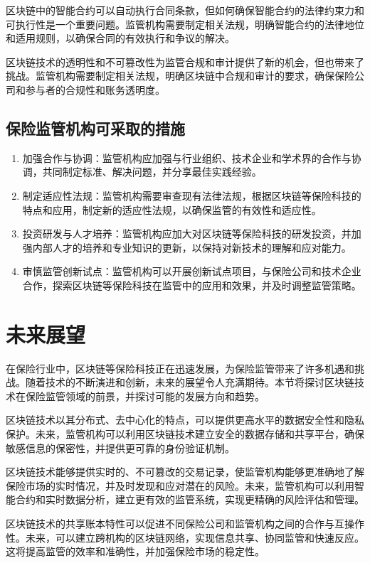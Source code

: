 \documentclass[a4paper,12pt]{ctexart}
\begin{document}
区块链中的智能合约可以自动执行合同条款，但如何确保智能合约的法律约束力和可执行性是一个重要问题。监管机构需要制定相关法规，明确智能合约的法律地位和适用规则，以确保合同的有效执行和争议的解决。

区块链技术的透明性和不可篡改性为监管合规和审计提供了新的机会，但也带来了挑战。监管机构需要制定相关法规，明确区块链中合规和审计的要求，确保保险公司和参与者的合规性和账务透明度。
\subsection{保险监管机构可采取的措施}
\begin{enumerate}
    \item 加强合作与协调：监管机构应加强与行业组织、技术企业和学术界的合作与协调，共同制定标准、解决问题，并分享最佳实践经验。
    \item 制定适应性法规：监管机构需要审查现有法律法规，根据区块链等保险科技的特点和应用，制定新的适应性法规，以确保监管的有效性和适应性。
    \item 投资研发与人才培养：监管机构应加大对区块链等保险科技的研发投资，并加强内部人才的培养和专业知识的更新，以保持对新技术的理解和应对能力。
    \item 审慎监管创新试点：监管机构可以开展创新试点项目，与保险公司和技术企业合作，探索区块链等保险科技在监管中的应用和效果，并及时调整监管策略。
\end{enumerate}
\section{未来展望}
在保险行业中，区块链等保险科技正在迅速发展，为保险监管带来了许多机遇和挑战。随着技术的不断演进和创新，未来的展望令人充满期待。本节将探讨区块链技术在保险监管领域的前景，并探讨可能的发展方向和趋势。

区块链技术以其分布式、去中心化的特点，可以提供更高水平的数据安全性和隐私保护。未来，监管机构可以利用区块链技术建立安全的数据存储和共享平台，确保敏感信息的保密性，并提供更可靠的身份验证机制。

区块链技术能够提供实时的、不可篡改的交易记录，使监管机构能够更准确地了解保险市场的实时情况，并及时发现和应对潜在的风险。未来，监管机构可以利用智能合约和实时数据分析，建立更有效的监管系统，实现更精确的风险评估和管理。

区块链技术的共享账本特性可以促进不同保险公司和监管机构之间的合作与互操作性。未来，可以建立跨机构的区块链网络，实现信息共享、协同监管和快速反应。这将提高监管的效率和准确性，并加强保险市场的稳定性。
\end{document}
